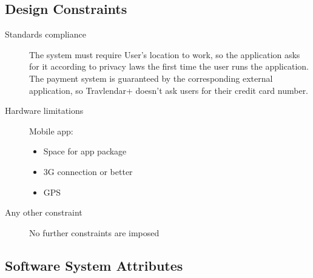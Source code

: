 		
\subsection{Design Constraints}
		\begin{description}
			\item[Standards compliance]
			The system must require User’s location to work, so the application asks for it according to privacy laws the first time the user runs the application.
			The payment system is guaranteed by the corresponding external application, so Travlendar+ doesn’t ask users for their credit card number.

			\item[Hardware limitations]
			Mobile app:
			\begin{itemize}
			\item Space for app package
			\item 3G connection or better
			\item GPS
		\end{itemize}

			\item[Any other constraint]
			No further constraints are imposed
\end{description}
		
\subsection{Software System Attributes}
	
